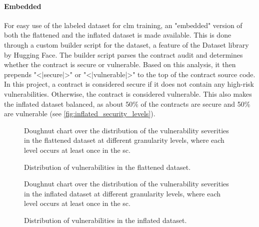 \paragraph{Embedded}
\label{sec:verified-smart-contracts-audit-embedded}
For easy use of the labeled dataset for \acrfull{clm} training, an
"embedded" version of both the flattened and the inflated dataset is made
available. This is done through a custom builder script for the dataset, a feature
of the Dataset library by Hugging Face. The builder script parses the contract audit and determines whether the contract is secure or vulnerable. Based on this analysis, it then prepends "<|secure|>" or "<|vulnerable|>" to the top of the contract source code. In this project, a contract is considered secure if it does not contain any high-risk vulnerabilities. Otherwise, the contract is considered vulnerable. This also makes the inflated dataset balanced, as about 50\% of the contracts are secure and 50\% are vulnerable (see \cref{fig:inflated_security_levels}).



\begin{figure}[htbp]
    \centering
    
    \caption{Doughnut chart over the distribution of the vulnerability severities in the flattened dataset at different granularity levels, where each level occurs at least once in the \acrshort{sc}.}
    \label{fig:flattened_security_levels}
    \vspace*{\floatsep}%
    
    \caption{Distribution of vulnerabilities in the flattened dataset.}
    \label{fig:flattened_vulnerabilities_bar}
\end{figure}

\begin{figure}[htbp]
    \centering
    
    \caption{Doughnut chart over the distribution of the vulnerability severities in the inflated dataset at different granularity levels, where each level occurs at least once in the \acrshort{sc}.}
    \label{fig:inflated_security_levels}
    
    \vspace*{\floatsep}%

    
    \caption{Distribution of vulnerabilities in the inflated dataset.}
    \label{fig:inflated_vulnerabilities_bar}
\end{figure}

